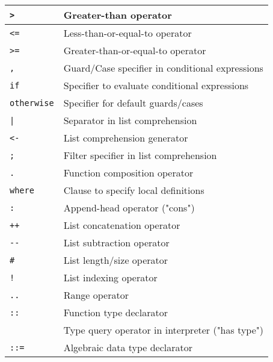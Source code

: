 \documentclass[]{article}
\begin{document}
\begin{minipage}[t][0pt]{\linewidth}
\begin{tabular}{ | l | l | }
	\texttt{>}                      & Greater-than operator                             \\ \hline
	\texttt{<=}                     & Less-than-or-equal-to operator                    \\ \hline
	\texttt{>=}                     & Greater-than-or-equal-to operator                 \\ \hline
	\hline
	\texttt{,}                      & Guard/Case specifier in conditional expressions   \\ \hline
	\texttt{if}                     & Specifier to evaluate conditional expressions     \\ \hline
	\texttt{otherwise}              & Specifier for default guards/cases                \\ \hline
	\texttt{|}                      & Separator in list comprehension                   \\ \hline
	\texttt{<-}                     & List comprehension generator                      \\ \hline
	\texttt{;}                      & Filter specifier in list comprehension            \\ \hline
	\hline
	\texttt{.}                      & Function composition operator                     \\ \hline
	\texttt{where}                  & Clause to specify local definitions               \\ \hline
	\texttt{:}                      & Append-head operator ("cons")                     \\ \hline
	\texttt{++}                     & List concatenation operator                       \\ \hline
	\texttt{-{}-}                   & List subtraction operator                         \\ \hline
	\texttt{\#}                     & List length/size operator                         \\ \hline
	\texttt{!}                      & List indexing operator                            \\ \hline
	\texttt{..}                     & Range operator                                    \\ \hline
	\hline
	\texttt{::}                     & Function type declarator                          \\ 
	                                & Type query operator in interpreter ("has type")   \\ \hline
	\texttt{::=}                    & Algebraic data type declarator                    \\ \hline

\end{tabular}
\end{minipage}
\end{document}
